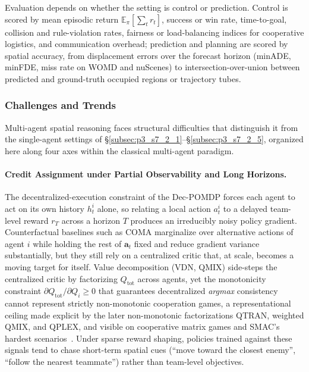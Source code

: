 Evaluation depends on whether the setting is control or prediction.
Control is scored by mean episodic return $\mathbb{E}_{\pi}\!\left[\sum_t r_t\right]$, success or win rate, time-to-goal, collision and rule-violation rates, fairness or load-balancing indices for cooperative logistics, and communication overhead; prediction and planning are scored by spatial accuracy, from displacement errors over the forecast horizon (minADE, minFDE, miss rate on WOMD and nuScenes) to intersection-over-union between predicted and ground-truth occupied regions or trajectory tubes.


\subsubsection{Challenges and Trends}

Multi-agent spatial reasoning faces structural difficulties that distinguish it from the single-agent settings of §\ref{subsec:p3_s7_2_1}--§\ref{subsec:p3_s7_2_5}, organized here along four axes within the classical multi-agent paradigm.

\paragraph{Credit Assignment under Partial Observability and Long Horizons.}
The decentralized-execution constraint of the Dec-POMDP forces each agent to act on its own history $h^i_t$ alone, so relating a local action $a^i_t$ to a delayed team-level reward $r_T$ across a horizon $T$ produces an irreducibly noisy policy gradient.
Counterfactual baselines such as COMA \cite{foerster2018coma} marginalize over alternative actions of agent $i$ while holding the rest of $\mathbf{a}_t$ fixed and reduce gradient variance substantially, but they still rely on a centralized critic that, at scale, becomes a moving target for itself.
Value decomposition (VDN, QMIX) \cite{sunehag2018vdn,rashid2018qmix} side-steps the centralized critic by factorizing $Q_\mathrm{tot}$ across agents, yet the monotonicity constraint $\partial Q_\mathrm{tot}/\partial Q_i \ge 0$ that guarantees decentralized \emph{argmax} consistency cannot represent strictly non-monotonic cooperation games, a representational ceiling made explicit by the later non-monotonic factorizations QTRAN, weighted QMIX, and QPLEX, and visible on cooperative matrix games and SMAC's hardest scenarios~\cite{son2019qtran,rashid2020wqmix,wang2021qplex,samvelyan2019smac}.
Under sparse reward shaping, policies trained against these signals tend to chase short-term spatial cues (``move toward the closest enemy'', ``follow the nearest teammate'') rather than team-level objectives.


